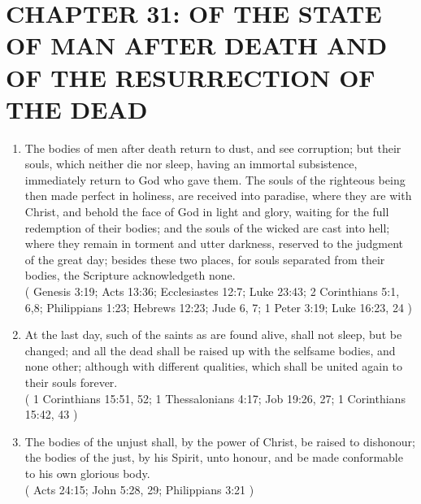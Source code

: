 \documentclass[12pt,a4paper]{book}
\begin{document}
\chapter{CHAPTER 31: OF THE STATE OF MAN AFTER DEATH AND OF THE RESURRECTION OF THE DEAD}
\label{ch-stat-dea}
\begin{enumerate}
\item The bodies of men after death return to dust, and see corruption; but their souls, which neither die nor sleep, having an immortal subsistence, immediately return to God who gave them. The souls of the righteous being then made perfect in holiness, are received into paradise, where they are with Christ, and behold the face of God in light and glory, waiting for the full redemption of their bodies; and the souls of the wicked are cast into hell; where they remain in torment and utter darkness, reserved to the judgment of the great day; besides these two places, for souls separated from their bodies, the Scripture acknowledgeth none.\\
( Genesis 3:19; Acts 13:36; Ecclesiastes 12:7; Luke 23:43; 2 Corinthians 5:1, 6,8; Philippians 1:23; Hebrews 12:23; Jude 6, 7; 1 Peter 3:19; Luke 16:23, 24 )
\item At the last day, such of the saints as are found alive, shall not sleep, but be changed; and all the dead shall be raised up with the selfsame bodies, and none other; although with different qualities, which shall be united again to their souls forever.\\
( 1 Corinthians 15:51, 52; 1 Thessalonians 4:17; Job 19:26, 27; 1 Corinthians 15:42, 43 )
\item The bodies of the unjust shall, by the power of Christ, be raised to dishonour; the bodies of the just, by his Spirit, unto honour, and be made conformable to his own glorious body.\\
( Acts 24:15; John 5:28, 29; Philippians 3:21 )
\end{enumerate}
\end{document}
